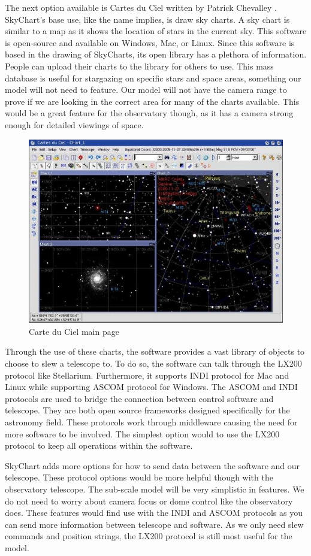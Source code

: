 \documentclass[12pt]{report}
\begin{document}
The next option available is Cartes du Ciel written by Patrick Chevalley \cite{skychart}. SkyChart's base use, like the name implies, is draw sky charts. A sky chart is similar to a map as it shows the location of stars in the current sky. This software is open-source and available on Windows, Mac, or Linux. Since this software is based in the drawing of SkyCharts, its open library has a plethora of information. People can upload their charts to the library for others to use. This mass database is useful for stargazing on specific stars and space areas, something our model will not need to feature. Our model will not have the camera range to prove if we are looking in the correct area for many of the charts available. This would be a great feature for the observatory though, as it has a camera strong enough for detailed viewings of space.

\begin{figure}[h]
	\centering
	\includegraphics[width=0.75\linewidth]{carte}
	\caption{Carte du Ciel main page}
  \label{fig:carte}
\end{figure}

Through the use of these charts, the software provides a vast library of objects to choose to slew a telescope to. To do so, the software can talk through the LX200 protocol like Stellarium. Furthermore, it supports INDI protocol for Mac and Linux while supporting ASCOM protocol for Windows. The ASCOM and INDI protocols are used to bridge the connection between control software and telescope. They are both open source frameworks designed specifically for the astronomy field. These protocols work through middleware causing the need for more software to be involved. The simplest option would to use the LX200 protocol to keep all operations within the software.

SkyChart adds more options for how to send data between the software and our telescope. These protocol options would be more helpful though with the observatory telescope. The sub-scale model will be very simplistic in features. We do not need to worry about camera focus or dome control like the observatory does. These features would find use with the INDI and ASCOM protocols as you can send more information between telescope and software. As we only need slew commands and position strings, the LX200 protocol is still most useful for the model.
\end{document}
